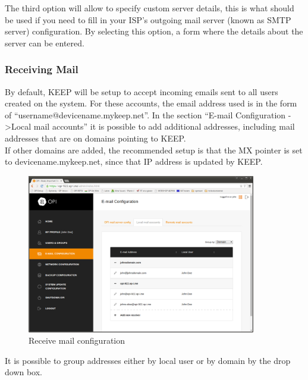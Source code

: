 \documentclass[12pt,a4paper,titlepage]{article}
\begin{document}
The third option will allow to specify custom server details, this is what should be used if you need to fill in your ISP's outgoing mail server (known as SMTP server) configuration. By selecting this option, a form where the details about the server can be entered.


\subsubsection{Receiving Mail}
By default, KEEP will be setup to accept incoming emails sent to all users created on the system. For these accounts, the email address used is in the form of ``username@devicename.mykeep.net''. In the section ``E-mail Configuration -\textgreater Local mail accounts'' it is possible to add additional addresses, including mail addresses that are on domains pointing to KEEP.\\
If other domains are added, the recommended setup is that the MX pointer is set to devicename.mykeep.net, since that IP address is updated by KEEP.
\begin{figure}[h!]
\centering
\includegraphics[width=10cm]{./img/receive-mail}
\caption{Receive mail configuration}
\end{figure}

It is possible to group addresses either by local user or by domain by the drop down box.
\end{document}
